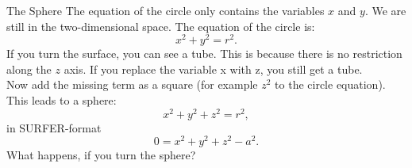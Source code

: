 \begin{surferPage}[Sphere]{The Sphere}
The equation of the circle only contains the variables $x$ and $y$. We are still in the two-dimensional space.
The equation of the circle is:
\[x^2+y^2=r^2.\]
If you turn the surface, you can see a tube. This is because there is no restriction along the $z$ axis. If you replace the variable x with z, you still get a tube.\\
Now add the missing term as a square (for example $z^2$ to the circle equation). 
This leads to a sphere:
\[x^2+y^2+z^2=r^2,\]
in SURFER-format
\[0=x^2+y^2+z^2-a^2.\]
What happens, if you turn the sphere?
\end{surferPage}
